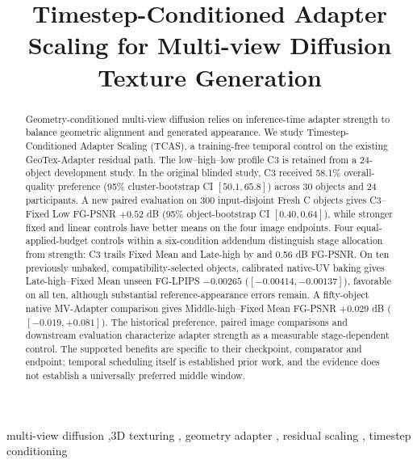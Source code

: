 \documentclass[times,twocolumn,final]{elsarticle}
\providecommand{\DIFadd}[1]{{\protect\color{blue} \sf #1}} %
\providecommand{\DIFaddbegin}{} %
\providecommand{\DIFaddend}{} %
\begin{document}
\begin{frontmatter}

\title{Timestep-Conditioned Adapter Scaling for Multi-view Diffusion Texture Generation}


\begin{abstract}
  \DIFaddbegin \DIFadd{Geometry-conditioned multi-view diffusion relies on inference-time adapter strength to balance geometric alignment and generated appearance. We study }\DIFaddend Timestep-Conditioned Adapter Scaling (TCAS), a training-free \DIFaddbegin \DIFadd{temporal control on the existing GeoTex-Adapter residual path. The }\DIFaddend low--high--low   \DIFaddbegin \DIFadd{profile }\DIFaddend C3   \DIFaddbegin \DIFadd{is retained from }\DIFaddend a 24-object   \DIFaddbegin \DIFadd{development study. In the original blinded study, C3 received 58.1\% overall-quality preference (95\% cluster-bootstrap CI $[50.1,65.8]$) across 30 objects and 24 participants. A new paired evaluation on 300 input-disjoint Fresh C objects gives C3--Fixed Low FG-PSNR $+0.52$ dB (95\% object-bootstrap CI $[0.40,0.64]$), while stronger fixed and linear controls have better means on the four image endpoints. Four equal-applied-budget controls within a six-condition addendum distinguish stage allocation from strength: C3 trails Fixed Mean and Late-high }\DIFaddend by   \DIFaddbegin \DIFadd{0.13 and 0.56 dB FG-PSNR. On ten previously unbaked, compatibility-selected objects, calibrated native-UV baking gives Late-high--Fixed Mean unseen FG-LPIPS $-0.00265$ ($[-0.00414,-0.00137]$), favorable on all ten, although substantial reference-appearance errors remain. A fifty-object native MV-Adapter comparison gives Middle-high--Fixed Mean FG-PSNR $+0.029$ dB ($[-0.019,+0.081]$). The historical preference, paired image comparisons and downstream evaluation characterize }\DIFaddend adapter strength as a \DIFaddbegin \DIFadd{measurable }\DIFaddend stage-dependent   \DIFaddbegin \DIFadd{control. The supported benefits are specific to their checkpoint, comparator and endpoint; temporal scheduling itself is established prior work, and the evidence does not establish a universally preferred middle window}\DIFaddend .
\end{abstract}

\begin{keyword}
\KWD
multi-view diffusion   \sep 3D   \DIFaddbegin \DIFadd{texturing }\DIFaddend \sep   \DIFaddbegin \DIFadd{geometry adapter }\DIFaddend \sep   \DIFaddbegin \DIFadd{residual }\DIFaddend scaling \sep   \DIFaddbegin \DIFadd{timestep conditioning
}\DIFaddend \end{keyword}

\end{frontmatter}
\end{document}
